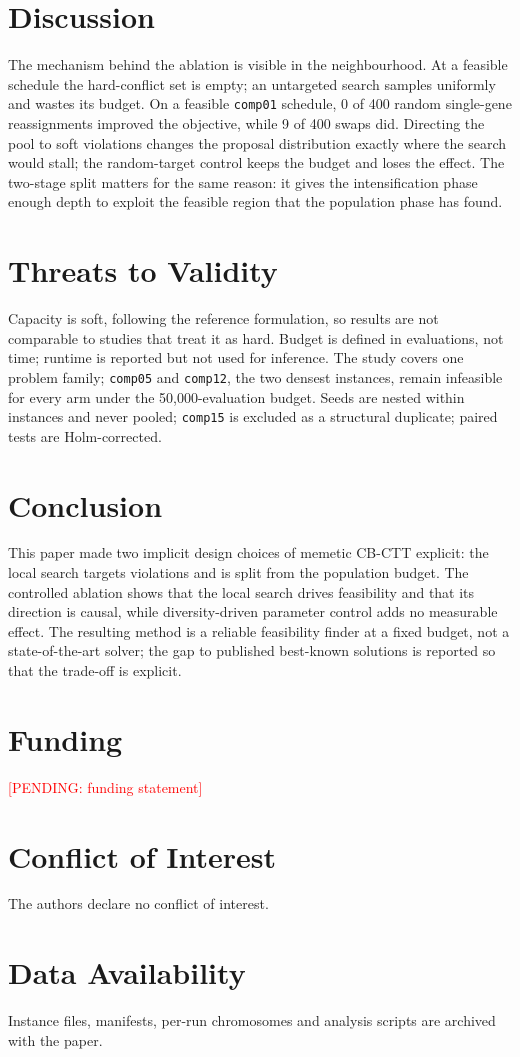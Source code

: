 \documentclass[journal]{IEEEtran}
\newcommand{\pending}[1]{\textcolor{red}{[PENDING: #1]}}
\newcommand{\code}[1]{\texttt{#1}}
\begin{document}
\section{Discussion}
The mechanism behind the ablation is visible in the neighbourhood. At a feasible schedule the hard-conflict set is empty; an untargeted search samples uniformly and wastes its budget. On a feasible \code{comp01} schedule, 0 of 400 random single-gene reassignments improved the objective, while 9 of 400 swaps did. Directing the pool to soft violations changes the proposal distribution exactly where the search would stall; the random-target control keeps the budget and loses the effect. The two-stage split matters for the same reason: it gives the intensification phase enough depth to exploit the feasible region that the population phase has found.

\section{Threats to Validity}
Capacity is soft, following the reference formulation, so results are not comparable to studies that treat it as hard. Budget is defined in evaluations, not time; runtime is reported but not used for inference. The study covers one problem family; \code{comp05} and \code{comp12}, the two densest instances, remain infeasible for every arm under the 50{,}000-evaluation budget. Seeds are nested within instances and never pooled; \code{comp15} is excluded as a structural duplicate; paired tests are Holm-corrected.

\section{Conclusion}
This paper made two implicit design choices of memetic CB-CTT explicit: the local search targets violations and is split from the population budget. The controlled ablation shows that the local search drives feasibility and that its direction is causal, while diversity-driven parameter control adds no measurable effect. The resulting method is a reliable feasibility finder at a fixed budget, not a state-of-the-art solver; the gap to published best-known solutions is reported so that the trade-off is explicit.

\section*{Funding}
\pending{funding statement}

\section*{Conflict of Interest}
The authors declare no conflict of interest.

\section*{Data Availability}
Instance files, manifests, per-run chromosomes and analysis scripts are archived with the paper.



\end{document}
